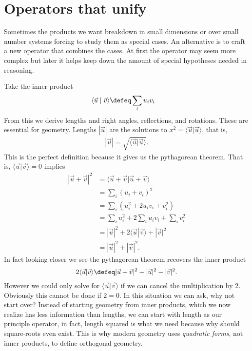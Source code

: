 
\section{Operators that unify}
Sometimes the products we want breakdown in small dimensions or over small
number systems forcing to study them as special cases.  An alternative is to
craft a new operator that combines the cases.  At first the operator 
may seem more complex but later it helps keep down the amount of special 
hypotheses needed in reasoning.

Take the inner product 
\begin{align*}
    \langle \vec{u}\mid \vec{v}\rangle & \defeq \sum_{i} u_i v_i
\end{align*}
From this we derive lengths and right angles, reflections, and rotations.
These are essential for geometry.
Lengths $|\vec{u}|$ are the solutions to $x^2=\langle \vec{u}|\vec{u}\rangle$, that is,
\begin{align*}
    |\vec{u}| = \sqrt{\langle \vec{u}|\vec{u}\rangle}.
\end{align*}
This is the perfect definition because it gives us the pythagorean theorem.
That is, $\langle \vec{u}|\vec{v}\rangle=0$ implies
\begin{align*}
    |\vec{u}+\vec{v}|^2 & = \langle \vec{u}+\vec{v}|\vec{u}+\vec{v}\rangle\\
    & = \sum_i (u_i+v_i)^2\\
    & = \sum_i (u_i^2+2u_i v_i+v_i^2)\\
    & = \sum_i u_i^2+2\sum_i u_i v_i + \sum_i v_i^2\\
    & = |\vec{u}|^2+2\langle \vec{u}|\vec{v}\rangle +|\vec{v}|^2\\
    & = |\vec{u}|^2+|\vec{v}|^2.
\end{align*}
In fact looking closer we see the pythagorean theorem recovers the inner product
\begin{align*}
    2\langle \vec{u}|\vec{v}\rangle \defeq  
        |\vec{u}+\vec{v}|^2-|\vec{u}|^2-|\vec{v}|^2.
\end{align*}
However we could only solve for $\langle \vec{u}|\vec{v}\rangle$ if we can 
cancel the multiplication by 2.    Obviously this cannot be done if $2=0$.
In this situation we can ask, why not start over?  Instead of starting geometry 
from inner products, which we now realize has less information than lengths,
we can start with length as our principle operator, in fact, length squared 
is what we need because why should square-roots even exist.  This is why 
modern geometry uses \emph{quadratic forms}, not inner products, to 
define orthogonal geometry.

